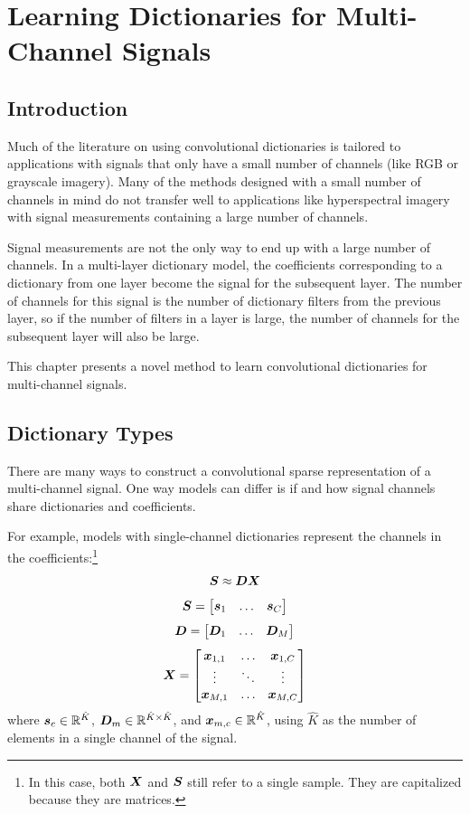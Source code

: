 \chapter{Learning Dictionaries for Multi-Channel Signals}

\section{Introduction}
Much of the literature on using convolutional dictionaries is tailored to applications with signals that only have a small number of channels (like RGB or grayscale imagery). Many of the methods designed with a small number of channels in mind do not transfer well to applications like hyperspectral imagery \cite{PURR1947} with signal measurements containing a large number of channels.

Signal measurements are not the only way to end up with a large number of channels. In a multi-layer dictionary model, the coefficients corresponding to a dictionary from one layer become the signal for the subsequent layer.  The number of channels for this signal is the number of dictionary filters from the previous layer, so if the number of filters in a layer is large, the number of channels for the subsequent layer will also be large.

This chapter presents a novel method to learn convolutional dictionaries for multi-channel signals. 
\section{Dictionary Types}
There are many ways to construct a convolutional sparse representation of a multi-channel signal. One way models can differ is if and how signal channels share dictionaries and coefficients.

For example, models with single-channel dictionaries represent the channels in the coefficients:\footnote{In this case, both $\bm{X}$ and $\bm{S}$ still refer to a single sample. They are capitalized because they are matrices.}
%
\begin{equation}
\bm{S} \approx \bm{D}\bm{X}
\end{equation}
\begin{equation}
\bm{S} = \begin{bmatrix} \bm{s}_1 & \hdots & \bm{s}_C \end{bmatrix}
\end{equation}
\begin{equation}
\bm{D} = \begin{bmatrix} \bm{D}_1 & \hdots & \bm{D}_M \end{bmatrix}
\end{equation}
\begin{equation}
\bm{X} = \begin{bmatrix} \bm{x}_{1,1} & \hdots & \bm{x}_{1,C} \\ \vdots & \ddots & \vdots \\ \bm{x}_{M,1} & \hdots & \bm{x}_{M,C} \end{bmatrix}
\end{equation}
%
where $\bm{s}_c \in \mathbb{R}^{\hat{K}}$, $\bm{D}_m \in \mathbb{R}^{\hat{K} \times \hat{K}}$, and $\bm{x}_{m,c} \in \mathbb{R}^{\hat{K}}$, using $\hat{K}$ as the number of elements in a single channel of the signal.


